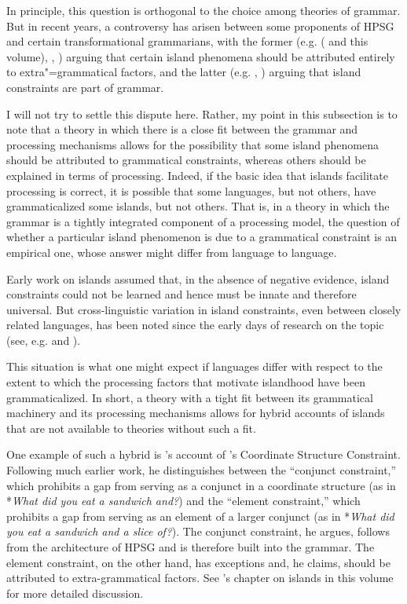 \documentclass[a4paper]{article}
\begin{document}
In principle, this question is orthogonal to the choice among theories of grammar.  But in recent years, a controversy has arisen between some proponents of HPSG and certain transformational grammarians, with the former (e.g. \citeauthor{Chaves2012} (\citeyear{Chaves2012} and this volume), \citet{HofmeisterSag2010}, \citet{HofmeisterEtal2013}) arguing that certain island phenomena should be attributed entirely to extra"=grammatical factors, and the latter (e.g. \citet{Phillips2013}, \citet{SWP2012a-u}) arguing that island constraints are part of grammar.

I will not try to settle this dispute here.  Rather, my point in this subsection is to note that a theory in which there is a close fit between the grammar and processing mechanisms allows for the possibility that some island phenomena should be attributed to grammatical constraints, whereas others should be explained in terms of processing.  Indeed, if the basic idea that islands facilitate processing is correct, it is possible that some languages, but not others, have grammaticalized some islands, but not others.  That is, in a theory in which the grammar is a tightly integrated component of a processing model, the question of whether a particular island phenomenon is due to a grammatical constraint is an empirical one, whose answer might differ from language to language. 

Early work on islands assumed that, in the absence of negative evidence, island constraints could not be learned and hence must be innate and therefore universal.  But cross-linguistic variation in island constraints, even between closely related languages, has been noted since the early days of research on the topic (see, e.g. \citet{Erteschik73a-u} and \citet{EngdahlEjerhed82}).

This situation is what one might expect if languages differ with respect to the extent to which the processing factors that motivate islandhood have been grammaticalized.  In short, a theory with a tight fit between its grammatical machinery and its processing mechanisms allows for hybrid accounts of islands that are not available to theories without such a fit.

One example of such a hybrid is \citeauthor{Chaves2012}'s \citeyearpar{Chaves2012} account of \citeauthor{Ross67}'s Coordinate Structure Constraint.  Following much earlier work, he distinguishes between the ``conjunct constraint,'' which prohibits a gap from serving as a conjunct in a coordinate structure (as in *{\it What did you eat a sandwich and?}) and the ``element constraint,'' which prohibits a gap from serving as an element of a larger conjunct (as in *{\it What did you eat a sandwich and a slice of?}).  The conjunct constraint, he argues, follows from the architecture of HPSG and is therefore built into the grammar.  The element constraint, on the other hand, has exceptions and, he claims, should be attributed to extra-grammatical factors.  See \citeauthor{Chaves2012}'s chapter on islands in this volume for more detailed discussion. 
\end{document}
